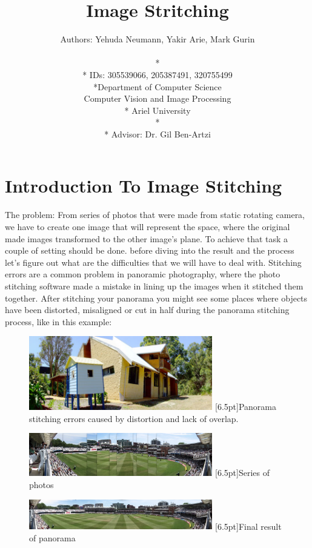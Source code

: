 \documentclass[12pt,a4paper]{report}
\title{\huge {\textbf{Image Stritching}}}
\author{\LARGE \centerline{
Authors: Yehuda Neumann, Yakir Arie, Mark Gurin}
\\* 
\\* {IDs:  305539066, 205387491, 320755499 }
\\*{Department of Computer Science
}
\\ {Computer Vision and Image Processing}
\\*
{Ariel University}
\\*
\\* {Advisor: Dr. Gil Ben-Artzi}}
\date{\centerline {October, 2019}}
\begin{document}
\maketitle
\section*{Introduction To Image Stitching}
The problem:
From series of photos that were made from static rotating camera, we have to  create one image that will represent the space, where the original made images transformed to the other image’s plane. To achieve that task a couple of setting should be done.
before diving into the result and the process let's figure out what are the difficulties that we will have to deal with.
Stitching errors are a common problem in panoramic photography, where the photo stitching software made a mistake in lining up the images when it stitched them together. After stitching your panorama you might see some places where objects have been distorted, misaligned or cut in half during the panorama stitching process, like in this example:

\begin{figure}[h]
\centering
\includegraphics[width=8cm]{p4-stitch-error}
[6.5pt]{Panorama stitching errors caused by distortion and lack of overlap.}
\end{figure}

\begin{figure}[h]
\centering
\includegraphics[width=8cm]{seriesofphotos}
[6.5pt]{Series of photos  }
\end{figure}

\begin{figure}[h]
\centering
\includegraphics[width=8cm]{panoramfinal}
[6.5pt]{Final result of panorama}
\end{figure}
\end{document}
